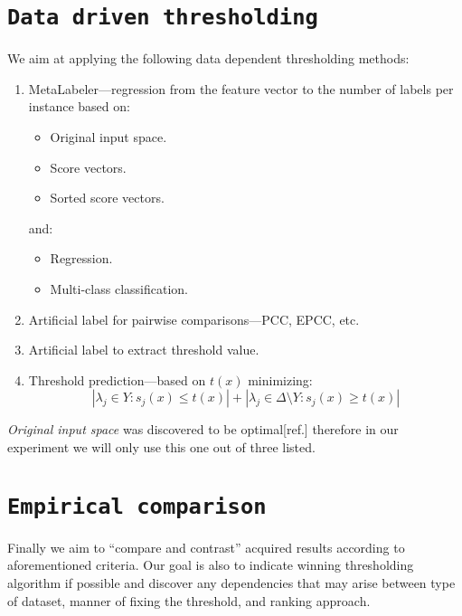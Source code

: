 \documentclass[12pt,a4paper,twocolumn]{article}
\newcommand{\ts}{\textsuperscript}
\begin{document}
\section*{\texttt{Data driven thresholding}}
We aim at applying the following data dependent thresholding methods:
\begin{enumerate}
\item MetaLabeler---regression from the feature vector to the number of labels per instance based on:
	\begin{itemize} %
	\item Original input space.
	\item Score vectors.
	\item Sorted score vectors.
	\end{itemize}
	and:
	\begin{itemize} %
	\item Regression.
	\item Multi-class classification.
	\end{itemize}

\item Artificial label for pairwise comparisons---PCC, EPCC, etc.
\item Artificial label to extract threshold value.
\item Threshold prediction---based on $t(x)$ minimizing:
	$$
	| \lambda_j \in Y : s_j(x) \leq t(x) | + | \lambda_j \in \Delta \text{\textbackslash{}} Y : s_j(x) \geq t(x) |
	$$
\end{enumerate}

\emph{Original input space} was discovered to be optimal[ref.] therefore in our experiment we will only use this one out of three listed.\\

\section*{\texttt{Empirical comparison}}
Finally we aim to ``compare and contrast'' acquired results according to aforementioned criteria. Our goal is also to indicate winning thresholding algorithm if possible and discover any dependencies that may arise between type of dataset, manner of fixing the threshold, and ranking approach.
\end{document}
